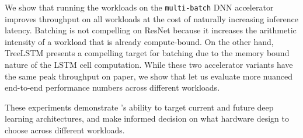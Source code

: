 We show that running the workloads
  on the \texttt{multi-batch} DNN accelerator improves throughput on all workloads at the cost
  of naturally increasing inference latency.
%
Batching is not compelling on ResNet because it increases the arithmetic
  intensity of a workload that is already compute-bound.
%
On the other hand, TreeLSTM presents a compelling target for batching due to the
  memory bound nature of the LSTM cell computation.
%
While these two accelerator variants have the same peak throughput on paper, we show that \relay let us
  evaluate more nuanced end-to-end performance numbers across different workloads.


These experiments demonstrate \relay's ability to target current and future deep learning architectures,
and make informed decision on what hardware design to choose across different workloads.




